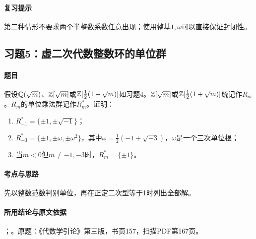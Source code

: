 \paragraph{复习提示}

第二种情形不要求两个半整数系数任意出现；使用整基$1,\omega$可以直接保证封闭性。

\subsection{习题5：虚二次代数整数环的单位群}

\label{ex:4:5}

\paragraph{题目}

假设$\mathbb Q(\sqrt m)$、$\mathbb Z[\sqrt m]$或$\mathbb Z[\tfrac12(1+\sqrt m)]$如习题4。$\mathbb Z[\sqrt m]$或$\mathbb Z[\tfrac12(1+\sqrt m)]$统记作$R_m$。$R_m$的单位乘法群记作$R_m^*$。证明：
\begin{enumerate}[label=(\roman*)]
\item $R_{-1}^*=\{\pm1,\pm\sqrt{-1}\}$；
\item $R_{-3}^*=\{\pm1,\pm\omega,\pm\omega^2\}$，其中$\omega=\tfrac12(-1+\sqrt{-3})$，$\omega$是一个三次单位根；
\item 当$m<0$但$m\ne-1,-3$时，$R_m^*=\{\pm1\}$。
\end{enumerate}

\paragraph{考点与思路}

先以整数范数判别单位，再在正定二次型等于1时列出全部解。

\paragraph{所用结论与原文依据}

；。原题：《代数学引论》第三版，书页157，扫描PDF第167页。


